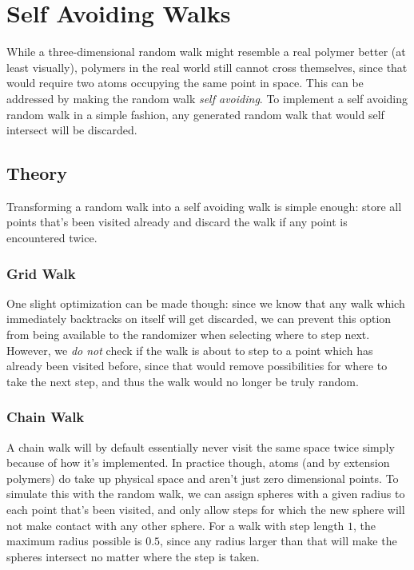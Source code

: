 \documentclass[a4paper,12pt]{article}
\begin{document}
\section*{Self Avoiding Walks}

While a three-dimensional random walk might resemble a real polymer better (at least visually), polymers in the
real world still cannot cross themselves, since that would require two atoms occupying the same point in space.
This can be addressed by making the random walk \emph{self avoiding}. To implement a self avoiding random walk in
a simple fashion, any generated random walk that would self intersect will be discarded.

\subsection*{Theory}

Transforming a random walk into a self avoiding walk is simple enough: store all points that's been visited already
and discard the walk if any point is encountered twice.

\subsubsection*{Grid Walk}

One slight optimization can be made though: since we know that any walk which
immediately backtracks on itself will get discarded, we can prevent this option from being available to the
randomizer when selecting where to step next. However, we \emph{do not} check if the walk is about to step to a
point which has already been visited before, since that would remove possibilities for where to take the next step,
and thus the walk would no longer be truly random.

\subsubsection*{Chain Walk}

A chain walk will by default essentially never visit the same space twice simply because of how it's implemented.
In practice though, atoms (and by extension polymers) do take up physical space and aren't just zero dimensional
points. To simulate this with the random walk, we can assign spheres with a given radius to each point that's been
visited, and only allow steps for which the new sphere will not make contact with any other sphere. For a walk with
step length $1$, the maximum radius possible is $0.5$, since any radius larger than that will make the spheres
intersect no matter where the step is taken.
\end{document}
